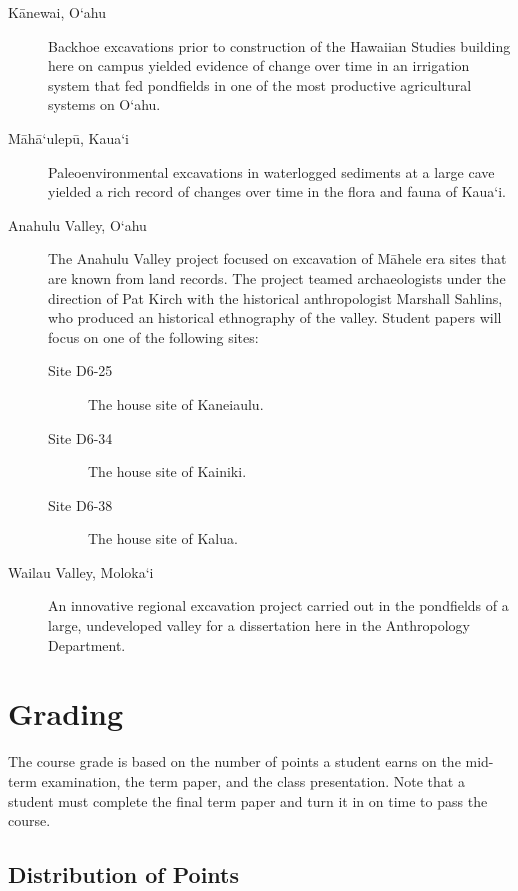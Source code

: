 \documentclass{scrartcl}
\begin{document}
\begin{description}
\item[{K\={a}newai, O`ahu}] Backhoe excavations prior to construction of the Hawaiian
Studies building here on campus yielded evidence of change
over time in an irrigation system that fed pondfields in
one of the most productive agricultural systems on O`ahu.
\item[{M\={a}h\={a}`ulep\={u}, Kaua`i}] Paleoenvironmental excavations in waterlogged sediments
at a large cave yielded a rich record of changes over time in the flora
and fauna of Kaua`i.
\end{description}

\begin{description}
\item[{Anahulu Valley, O`ahu}] The Anahulu Valley project focused on excavation of
M\={a}hele era sites that are known from land records. The project teamed
archaeologists under the direction of Pat Kirch with the historical
anthropologist Marshall Sahlins, who produced an historical ethnography
of the valley. Student papers will focus on one of the following sites:
\begin{description}
\item[{Site D6-25}] The house site of Kaneiaulu.
\item[{Site D6-34}] The house site of Kainiki.
\item[{Site D6-38}] The house site of Kalua.
\end{description}
\item[{Wailau Valley, Moloka`i}] An innovative regional excavation project carried
out in the pondfields of a large, undeveloped valley for a dissertation
here in the Anthropology Department.
\end{description}


\section{Grading}
\label{sec:org7abc236}

The course grade is based on the number of points a student earns on the
mid-term examination, the term paper, and the class presentation. Note that a
student must complete the final term paper and turn it in on time to pass the
course.

\subsection{Distribution of Points}
\label{sec:orgc87a7b2}
\end{document}
